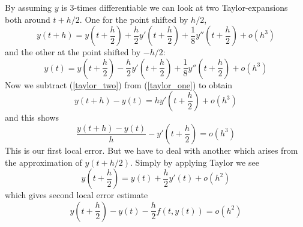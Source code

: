 \documentclass[17pt]{extarticle}
\begin{document}
By assuming $y$ is 3-times differentiable we can look at two Taylor-expansions both around $t+h/2$. One for the point shifted by $h/2$,
\begin{equation} \label{taylor_one}
	y(t+h)=y\left(t+\frac{h}{2}\right)+\frac{h}{2}y'\left(t+\frac{h}{2}\right)+\frac{1}{8}y''\left(t+\frac{h}{2}\right)+o(h^3)
\end{equation}
and the other at the point shifted by $-h/2$:
\begin{equation} \label{taylor_two}
	y(t)=y\left(t+\frac{h}{2}\right)-\frac{h}{2}y'\left(t+\frac{h}{2}\right)+\frac{1}{8}y''\left(t+\frac{h}{2}\right)+o(h^3)
\end{equation}
Now we subtract (\ref{taylor_two}) from (\ref{taylor_one}) to obtain
\begin{equation*}
	y(t+h)-y(t)=hy'\left(t+\frac{h}{2}\right)+o(h^3)
\end{equation*}
and this shows
$$
\frac{y(t+h)-y(t)}{h}-y'\left(t+\frac{h}{2}\right)=o(h^3)
$$
This is our first local error. But we have to deal with another which arises from the approximation of $y(t+h/2)$. Simply by applying Taylor we see
$$
y\left(t+\frac{h}{2}\right)=y(t)+\frac{h}{2}y'(t)+o(h^2)
$$
which gives second local error estimate
$$
y\left(t+\frac{h}{2}\right)-y(t)-\frac{h}{2}f(t,y(t))=o(h^2)
$$
\end{document}
